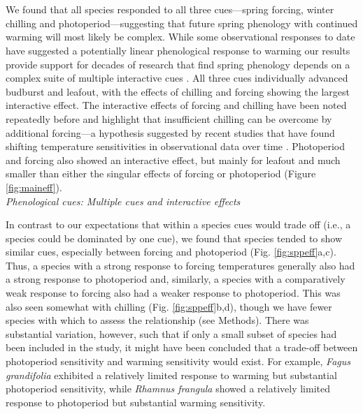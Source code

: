 \documentclass[11pt]{article}
\begin{document}
\vspace{2ex}\\
\vspace{2ex}\\
We found that all species responded to all three cues---spring forcing, winter chilling and photoperiod---suggesting that future spring phenology with continued warming will most likely be complex. While some observational responses to date have suggested a potentially linear phenological response to warming \citep{Ellwood2012} our results provide support for decades of research that find spring phenology depends on a complex suite of multiple interactive cues \citep[e.g.,][]{Heide:1993,Caffarra:2011aa}. All three cues individually advanced budburst and leafout, with the effects of chilling and forcing showing the largest interactive effect. The interactive effects of forcing and chilling have been noted repeatedly before \citep[e.g.,][]{Heide:1993b,Caffarra:2011aa} and highlight that insufficient chilling can be overcome by additional forcing---a hypothesis suggested by recent studies that have found shifting temperature sensitivities in observational data over time \citep{yu2010,fu2015}. Photoperiod and forcing also showed an interactive effect, but mainly for leafout and much smaller than either the singular effects of forcing or photoperiod (Figure \ref{fig:maineff}). \\

\noindent \emph{Phenological cues: Multiple cues and interactive effects}

\noindent In contrast to our expectations that within a species cues would trade off (i.e., a species could be dominated by one cue), we found that species tended to show similar cues, especially between forcing and photoperiod (Fig. \ref{fig:sppeff}a,c). Thus, a species with a strong response to forcing temperatures generally also had a strong response to photoperiod and, similarly, a species with a comparatively weak response to forcing also had a weaker response to photoperiod. This was also seen somewhat with chilling (Fig. \ref{fig:sppeff}b,d), though we have fewer species with which to assess the relationship (see Methods). There was substantial variation, however, such that if only a small subset of species had been included in the study, it might have been concluded that a trade-off between photoperiod sensitivity and warming sensitivity would exist. For example, \emph{Fagus grandifolia} exhibited a relatively limited response to warming but substantial photoperiod sensitivity, while \emph{Rhamnus frangula} showed a relatively limited response to photoperiod but substantial warming sensitivity.
\end{document}
